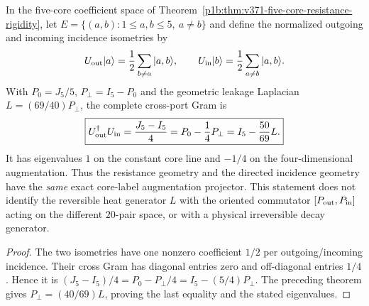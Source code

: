 \documentclass[11pt]{article}
\begin{document}
\begin{corollary}
\label{p1b:cor:v372-resistance-orientation-bridge}
In the five-core coefficient space of
Theorem~\ref{p1b:thm:v371-five-core-resistance-rigidity},
let $E=\{(a,b):1\le a,b\le5,\ a\ne b\}$ and define the
normalized outgoing and incoming incidence isometries by
\[
 U_{\rm out}|a\rangle=\frac12\sum_{b\ne a}|a,b\rangle,
 \qquad
 U_{\rm in}|b\rangle=\frac12\sum_{a\ne b}|a,b\rangle.
\]
With $P_0=J_5/5$, $P_\perp=I_5-P_0$ and the geometric leakage
Laplacian $L=(69/40)P_\perp$, the complete cross-port Gram is
\[
 \boxed{U_{\rm out}^{\dagger}U_{\rm in}
 =\frac{J_5-I_5}{4}
 =P_0-\frac14P_\perp
 =I_5-\frac{50}{69}L.}
\]
It has eigenvalues $1$ on the constant core line and $-1/4$
on the four-dimensional augmentation. Thus the resistance geometry
and the directed incidence geometry have the \emph{same} exact
core-label augmentation projector. This statement does not identify
the reversible heat generator $L$ with the oriented commutator
$[P_{\rm out},P_{\rm in}]$ acting on the different $20$-pair space,
or with a physical irreversible decay generator.
\end{corollary}
\begin{proof}
The two isometries have one nonzero coefficient $1/2$ per
outgoing/incoming incidence. Their cross Gram has diagonal entries
zero and off-diagonal entries $1/4$. Hence it is
$(J_5-I_5)/4=P_0-P_\perp/4=I_5-(5/4)P_\perp$.
The preceding theorem gives $P_\perp=(40/69)L$, proving the
last equality and the stated eigenvalues.
\end{proof}
\end{document}

